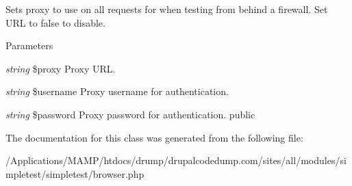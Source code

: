 \label{class_simple_browser_afcbae738b78039eaf3995f1fb4813b4c}
Sets proxy to use on all requests for when testing from behind a firewall. Set URL to false to disable. 
\begin{DoxyParams}{Parameters}
\item[{\em string}]\$proxy Proxy URL. \item[{\em string}]\$username Proxy username for authentication. \item[{\em string}]\$password Proxy password for authentication.  public \end{DoxyParams}


The documentation for this class was generated from the following file:\begin{DoxyCompactItemize}
\item 
/Applications/MAMP/htdocs/drump/drupalcodedump.com/sites/all/modules/simpletest/simpletest/browser.php\end{DoxyCompactItemize}
